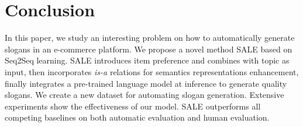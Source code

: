 \section{Conclusion}
\label{sec:conclusion}

In this paper, we study an interesting problem on how to 
automatically generate slogans in an e-commerce platform.
We propose a novel method SALE
based on Seq2Seq learning.
SALE introduces item preference 
and combines with topic as input,
then  incorporates \emph{is-a} relations for semantics representations enhancement,
finally integrates a pre-trained language model at inference 
to generate quality slogans.
We create a new dataset for automating slogan generation.
Extensive experiments show the effectiveness of our model.
SALE outperforms all competing baselines on both automatic evaluation
and human evaluation.

